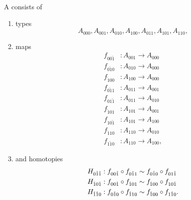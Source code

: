 \begin{defn}
A  consists of 
\begin{enumerate}
\item types
\begin{equation*}
A_{000},A_{001},A_{010},A_{100},A_{011},A_{101},A_{110},
\end{equation*}
\item maps
\begin{align*}
f_{00\check{1}} & : A_{001}\to A_{000} \\
f_{0\check{1}0} & : A_{010}\to A_{000} \\
f_{\check{1}00} & : A_{100}\to A_{000} \\
f_{0\check{1}1} & : A_{011}\to A_{001} \\
f_{01\check{1}} & : A_{011}\to A_{010} \\
f_{\check{1}01} & : A_{101}\to A_{001} \\
f_{10\check{1}} & : A_{101}\to A_{100} \\
f_{\check{1}10} & : A_{110}\to A_{010} \\
f_{1\check{1}0} & : A_{110}\to A_{100},
\end{align*}
\item and homotopies
\begin{align*}
H_{0\check{1}\check{1}} & : f_{00\check{1}}\circ f_{0\check{1}1} \sim f_{0\check{1}0}\circ f_{01\check{1}} \\
H_{\check{1}0\check{1}} & : f_{00\check{1}}\circ f_{\check{1}01} \sim f_{\check{1}00}\circ f_{10\check{1}} \\
H_{\check{1}\check{1}0} & : f_{0\check{1}0}\circ f_{\check{1}10} \sim f_{\check{1}00}\circ f_{1\check{1}0}.
\end{align*}
\end{enumerate}
\end{defn}

